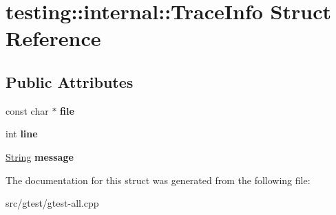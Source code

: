 \hypertarget{structtesting_1_1internal_1_1_trace_info}{}\section{testing\+:\+:internal\+:\+:Trace\+Info Struct Reference}
\label{structtesting_1_1internal_1_1_trace_info}
\subsection*{Public Attributes}
\begin{DoxyCompactItemize}
\item 
\mbox{\label{structtesting_1_1internal_1_1_trace_info_a5d801209d3c0840aa55cfd4b67504254}} 
const char $\ast$ {\bfseries file}
\item 
\mbox{\label{structtesting_1_1internal_1_1_trace_info_ae9d269de1b77f4a3180d0d34acb4d7ff}} 
int {\bfseries line}
\item 
\mbox{\label{structtesting_1_1internal_1_1_trace_info_aa083fc34fa9e424caa90cb9933aed504}} 
\mbox{\hyperlink{classtesting_1_1internal_1_1_string}{String}} {\bfseries message}
\end{DoxyCompactItemize}


The documentation for this struct was generated from the following file\+:\begin{DoxyCompactItemize}
\item 
src/gtest/gtest-\/all.\+cpp\end{DoxyCompactItemize}
